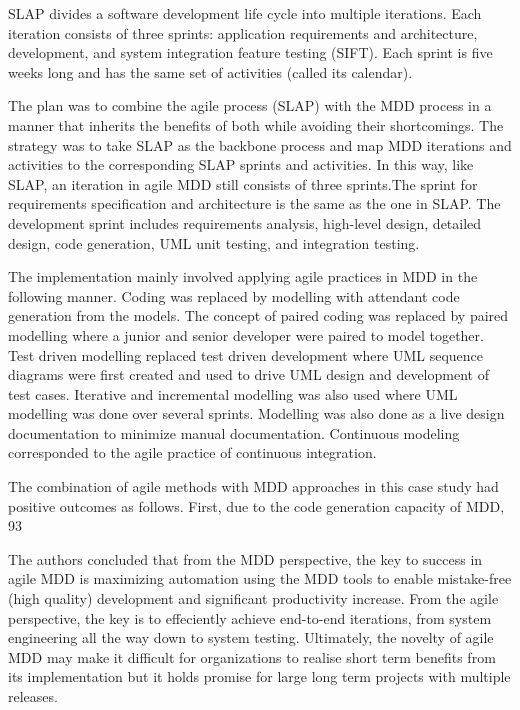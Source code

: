 \documentclass[10pt, a4paper, twocolumn]{article}
\begin{document}
SLAP divides a software development life cycle into multiple iterations. Each iteration consists of three sprints: application requirements and architecture, development, and system integration feature testing (SIFT). Each sprint is five weeks long and has the same set of activities (called its calendar).

The plan was to combine the agile process (SLAP) with the MDD process in a manner that inherits the benefits of both while avoiding their shortcomings. The strategy was to take SLAP as the backbone process and map MDD iterations and activities to the corresponding SLAP sprints and activities. In this way, like SLAP, an iteration in agile MDD still consists of three sprints.The sprint for requirements specification and architecture is the same as the one in SLAP. The development sprint includes requirements analysis, high-level design, detailed design, code generation, UML unit testing, and integration testing. 

The implementation mainly involved applying agile practices in MDD in the following manner. Coding was replaced by modelling with attendant code generation from the models. The concept of paired coding was replaced by paired modelling where a junior and senior developer were paired to model together. Test driven modelling replaced test driven development where UML sequence diagrams were first created and used to drive UML design and development of test cases. Iterative and incremental modelling was also used where UML modelling was done over several sprints. Modelling was also done as a live design documentation to minimize manual documentation. Continuous modeling corresponded to the agile practice of continuous integration.

The combination of agile methods with MDD approaches in this case study had positive outcomes as follows. First, due to the code generation capacity of MDD, 93%

The authors concluded that from the MDD perspective, the key to success in agile MDD is maximizing automation using the MDD tools to enable mistake-free (high quality) development and significant productivity increase. From the agile perspective, the key is to effeciently achieve end-to-end iterations, from system engineering all the way down to system testing. Ultimately, the novelty of agile MDD may make it difficult for organizations to realise short term benefits from its implementation but it holds promise for large long term projects with multiple releases.
\end{document}

